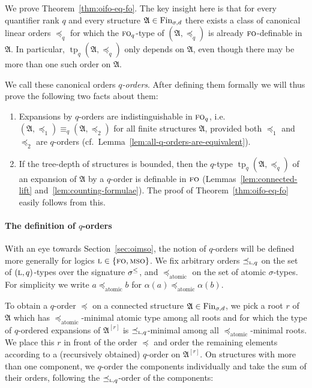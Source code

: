 \documentclass[11pt]{article}
\newcommand{\fin}{\textup{Fin}}
\newcommand{\logic}[1]{\textsc{#1}}
\newcommand{\logl}{\logic{l}}
\newcommand{\FO}{\logic{fo}}
\newcommand{\MSO}{\logic{mso}}
\newcommand{\leqsym}{\logic{\ensuremath{\leq}}}
\DeclareMathOperator{\tp}{tp}
\newcommand{\struct}[1]{\mathfrak{#1}}
\newcommand{\AS}{\struct{A}}
\newcommand{\set}[1]{\{#1\}}
\begin{document}
We prove Theorem~\ref{thm:oifo-eq-fo}. The key insight here is that for every
quantifier rank $q$ and every structure $\AS \in \fin_{\sigma,d}$ there exists a
class of canonical linear orders $\preceq_q$ for which the $\FO_q$-type of
$(\AS,\preceq_q)$ is already $\FO$-definable in $\AS$. In particular,
$\tp_q(\AS,\preceq_q)$ only depends on $\AS$, even though there may be more than
one such order on $\AS$.

We call these canonical orders \emph{$q$-orders}. After defining them
formally we will thus prove the following two facts about them:
\begin{enumerate}
\item Expansions by $q$-orders are indistinguishable in
  $\FO_q$, i.e. $(\AS,\preceq_1) \equiv_q (\AS,\preceq_2)$
  for all finite structures $\AS$, provided both $\preceq_1$ and
  $\preceq_2$ are $q$-orders
  (cf.~Lemma~\ref{lem:all-q-orders-are-equivalent}).
\item If the tree-depth of structures is bounded, then the $q$-type
  $\tp_{q}(\AS,\preceq_q)$ of an expansion of $\AS$ by a $q$-order is
  definable in $\FO$ (Lemmas~\ref{lem:connected-lift}
  and~\ref{lem:counting-formulae}). The proof of
  Theorem~\ref{thm:oifo-eq-fo} easily follows from this.
\end{enumerate}

\paragraph{The definition of $q$-orders}

With an eye towards Section~\ref{sec:oimso}, the notion of $q$-orders
will be defined more generally for logics $\logl\in
\set{\FO,\MSO}$. We fix arbitrary orders $\preceq_{\logl,q}$ on the
set of $(\logl,q)$-types over the signature $\sigma^{\leqsym}$, and
$\preceq_{\text{atomic}}$ on the set of atomic $\sigma$-types. For
simplicity we write $a \preceq_{\text{atomic}} b$ for $\alpha(a)
\preceq_{\text{atomic}} \alpha(b)$.

To obtain a $q$-order $\preceq$ on a connected structure $\AS \in
\fin_{\sigma,d}$, we pick a root $r$ of $\AS$ which has
$\preceq_{\text{atomic}}$-minimal atomic type among all roots and for
which the type of $q$-ordered expansions of $\AS^{[r]}$ is
$\preceq_{\logl,q}$-minimal among all
$\preceq_{\text{atomic}}$-minimal roots. We place this $r$ in front of
the order $\preceq$ and order the remaining elements according to a
(recursively obtained) $q$-order on $\AS^{[r]}$. On structures with
more than one component, we $q$-order the components individually and
take the sum of their orders, following the $\preceq_{\logl,q}$-order of
the components:
\end{document}
